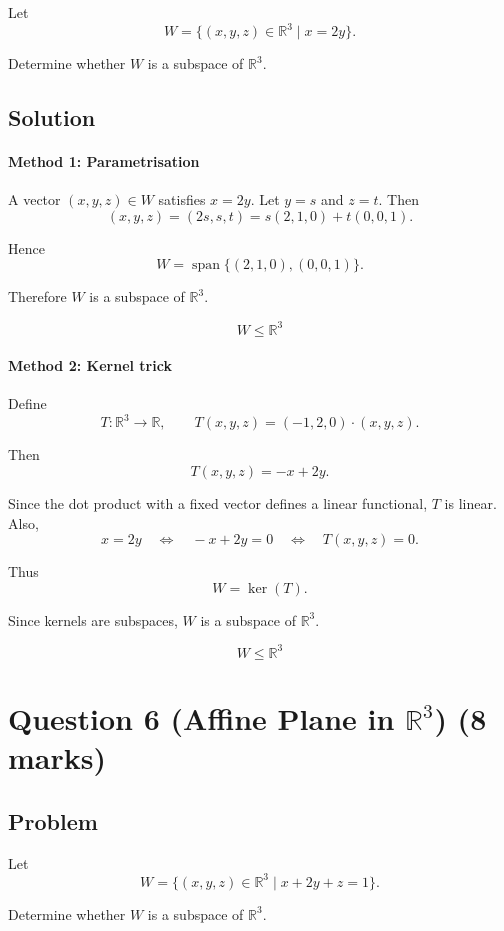 \documentclass[12pt]{article}
\newcommand{\Span}{\operatorname{span}}
\begin{document}
Let
\[
W=\{(x,y,z)\in\mathbb R^3\mid x=2y\}.
\]

Determine whether \(W\) is a subspace of \(\mathbb R^3\).

\subsection{Solution}

\paragraph{Method 1: Parametrisation}

A vector \((x,y,z)\in W\) satisfies \(x=2y\). Let \(y=s\) and \(z=t\). Then
\[
(x,y,z)=(2s,s,t)=s(2,1,0)+t(0,0,1).
\]

Hence
\[
W=\Span\{(2,1,0),(0,0,1)\}.
\]

Therefore \(W\) is a subspace of \(\mathbb R^3\).

\[
\boxed{W\le \mathbb R^3}
\]

\paragraph{Method 2: Kernel trick}

Define
\[
T:\mathbb R^3\to\mathbb R,\qquad T(x,y,z)=(-1,2,0)\cdot(x,y,z).
\]

Then
\[
T(x,y,z)=-x+2y.
\]

Since the dot product with a fixed vector defines a linear functional, \(T\) is linear. Also,
\[
x=2y
\quad\Longleftrightarrow\quad
-x+2y=0
\quad\Longleftrightarrow\quad
T(x,y,z)=0.
\]

Thus
\[
W=\ker(T).
\]

Since kernels are subspaces, \(W\) is a subspace of \(\mathbb R^3\).

\[
\boxed{W\le \mathbb R^3}
\]

\newpage
\section{Question 6 (Affine Plane in \(\mathbb R^3\)) \hfill (8 marks)}
\subsection{Problem}

Let
\[
W=\{(x,y,z)\in\mathbb R^3\mid x+2y+z=1\}.
\]

Determine whether \(W\) is a subspace of \(\mathbb R^3\).
\end{document}
